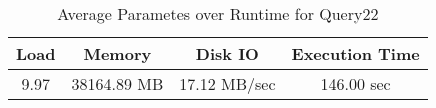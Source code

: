 \documentclass[../../main.tex]{subfiles}
\begin{document}
    \begin{table}
        \begin{center}
            \begin{tabular}{ |c|c|c|c| } 
            \hline
            Load & Memory & Disk IO & Execution Time\\
            \hline
            9.97 & 38164.89 MB & 17.12 MB/sec & 146.00 sec \\
            \hline
            \end{tabular}
            \\[1pt]
            \caption{Average Parametes over Runtime for Query22}
        \end{center}
    \end{table}
    \pagebreak
\end{document}
